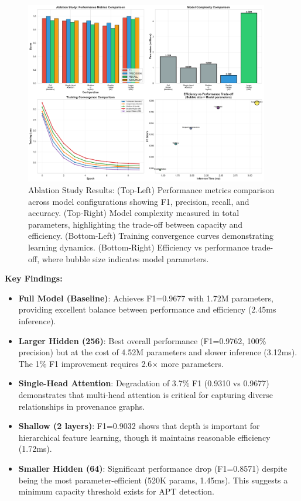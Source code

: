 \documentclass[conference]{IEEEtran}
\begin{document}
\begin{figure}[!t]
\centering
\includegraphics[width=0.95\textwidth]{experiments/results/ablation_study.pdf}
\caption{Ablation Study Results: (Top-Left) Performance metrics comparison across model configurations showing F1, precision, recall, and accuracy. (Top-Right) Model complexity measured in total parameters, highlighting the trade-off between capacity and efficiency. (Bottom-Left) Training convergence curves demonstrating learning dynamics. (Bottom-Right) Efficiency vs performance trade-off, where bubble size indicates model parameters.}
\label{fig:ablation}
\end{figure}

\textbf{Key Findings:}
\begin{itemize}
    \item \textbf{Full Model (Baseline)}: Achieves F1=0.9677 with 1.72M parameters, providing excellent balance between performance and efficiency (2.45ms inference).
    
    \item \textbf{Larger Hidden (256)}: Best overall performance (F1=0.9762, 100\% precision) but at the cost of 4.52M parameters and slower inference (3.12ms). The 1\% F1 improvement requires 2.6$\times$ more parameters.
    
    \item \textbf{Single-Head Attention}: Degradation of 3.7\% F1 (0.9310 vs 0.9677) demonstrates that multi-head attention is critical for capturing diverse relationships in provenance graphs.
    
    \item \textbf{Shallow (2 layers)}: F1=0.9032 shows that depth is important for hierarchical feature learning, though it maintains reasonable efficiency (1.72ms).
    
    \item \textbf{Smaller Hidden (64)}: Significant performance drop (F1=0.8571) despite being the most parameter-efficient (520K params, 1.45ms). This suggests a minimum capacity threshold exists for APT detection.
\end{itemize}
\end{document}
